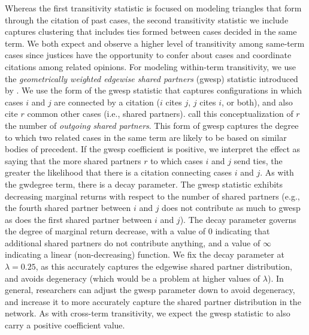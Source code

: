 \documentclass[headsepline=true, abstracton]{scrartcl}
\begin{document}
Whereas the first transitivity statistic is focused on modeling triangles that form through the citation of past cases, the second transitivity statistic we include captures clustering that includes ties formed between cases decided in the same term. We both expect and observe a higher level of transitivity among same-term cases since justices have the opportunity to confer about cases and coordinate citations among related opinions. For modeling within-term transitivity, we use the \textit{geometrically weighted edgewise shared partners} (gwesp) statistic introduced by \citet{hunter2006inference}. We use the form of the gwesp statistic that captures configurations in which cases $i$ and $j$ are connected by a citation ($i$ cites $j$, $j$ cites $i$, or both), and also cite $r$ common other cases (i.e., shared partners). \citet{Butts.2008} call this conceptualization of $r$ the number of \textit{outgoing shared partners}. This form of gwesp captures the degree to which two related cases in the same term are likely to be based on similar bodies of precedent. If the gwesp coefficient is positive, we interpret the effect as saying that the more shared partners $r$ to which cases $i$ and $j$ send ties, the greater the likelihood that there is a citation connecting cases $i$ and $j$.  As with the gwdegree term, there is a decay parameter. The gwesp statistic exhibits decreasing marginal returns with respect to the number of shared partners (e.g., the fourth shared partner between $i$ and $j$ does not contribute as much to gwesp as does the first shared partner between $i$ and $j$). The decay parameter governs the degree of marginal return decrease, with a value of 0 indicating that additional shared partners do not contribute anything, and a value of $\infty$ indicating a linear (non-decreasing) function.  We fix the decay parameter at $\lambda=0.25$, as this accurately captures the edgewise shared partner distribution, and avoids degeneracy (which would be a problem at higher values of $\lambda$). In general, researchers can adjust the gwesp parameter down to avoid degeneracy, and increase it to more accurately capture the shared partner distribution in the network. As with cross-term transitivity, we expect the gwesp statistic to also carry a positive coefficient value.
\end{document}

